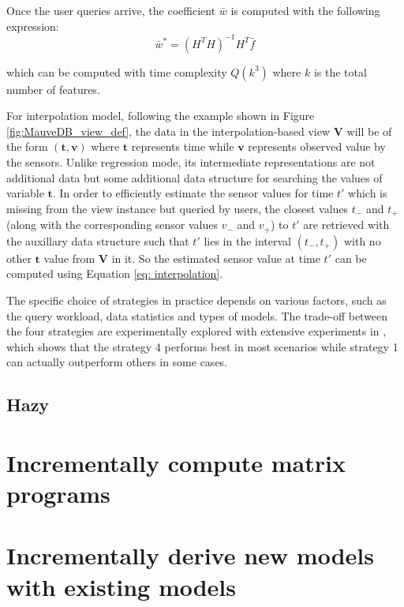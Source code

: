 Once the user queries arrive, the coefficient $\bar{w}$ is computed with the following expression:
\begin{equation}
    \bar{w}^*=(H^TH)^{-1}H^T\bar{f}
\end{equation}

which can be computed with time complexity $Q(k^3)$ where $k$ is the total number of features.

For interpolation model, following the example shown in Figure \ref{fig:MauveDB_view_def}, the data in the interpolation-based view $\textbf{V}$ will be of the form $(\textbf{t}, \textbf{v})$ where $\textbf{t}$ represents time while $\textbf{v}$ represents observed value by the sensors. Unlike regression mode, its intermediate representations are not additional data but some additional data structure for searching the values of variable $\textbf{t}$. In order to efficiently estimate the sensor values for time $t'$ which is missing from the view instance but queried by users, the closest values $t_{-}$ and $t_{+}$ (along with the corresponding sensor values $v_{-}$ and $v_{+}$) to $t'$ are retrieved with the auxillary data structure such that $t'$ lies in the interval $(t_{-}, t_{+})$ with no other $\textbf{t}$ value from $\textbf{V}$ in it. So the estimated sensor value at time $t'$ can be computed using Equation \ref{eq: interpolation}.

The specific choice of strategies in practice depends on various factors, such as the query workload, data statistics and types of models. The trade-off between the four strategies are experimentally explored with extensive experiments in \cite{deshpande2006mauvedb}, which shows that the strategy 4 performs best in most scenarios while strategy 1 can actually outperform others in some cases.

\subsection{Hazy}



\section{Incrementally compute matrix programs}


\section{Incrementally derive new models with existing models}